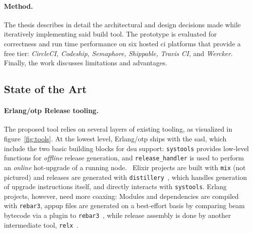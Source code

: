 \paragraph{Method.} The thesis describes in detail the architectural and design decisions made while iteratively implementing said build tool. The prototype is evaluated for correctness and run time performance on six hosted \acrshort{ci} platforms that provide a free tier: \emph{CircleCI, Codeship, Semaphore, Shippable, Travis CI,} and \emph{Wercker}. Finally, the work discusses limitations and advantages.


\subsection{State of the Art}\label{sec:sota}

\paragraph{Erlang/\acrshort{otp} Release tooling.} The proposed tool relies on several layers of existing tooling, as visualized in figure~\ref{fig:tools}. At the lowest level, Erlang/\acrshort{otp} ships with the \acrfull{sasl}, which include the two basic building blocks for \acrshort{dsu} support: \lstinline|systools| provides low-level functions for \emph{offline} release generation, and \lstinline|release_handler| is used to perform an \emph{online} hot-upgrade of a running node.~\cite{doc:otp}
Elixir projects are built with \lstinline|mix| (not pictured) and releases are generated with \lstinline|distillery|~\cite{distillery}, which handles generation of upgrade instructions itself, and directly interacts with \lstinline|systools|. Erlang projects, however, need more coaxing: Modules and dependencies are compiled with \lstinline|rebar3|, \acrfull{appup} files are generated on a best-effort basis by comparing \acrshort{beam} bytecode via a plugin to \lstinline|rebar3|~\cite{rebar3appup}, while release assembly is done by another intermediate tool, \lstinline|relx|~\cite{loder2016production}.

